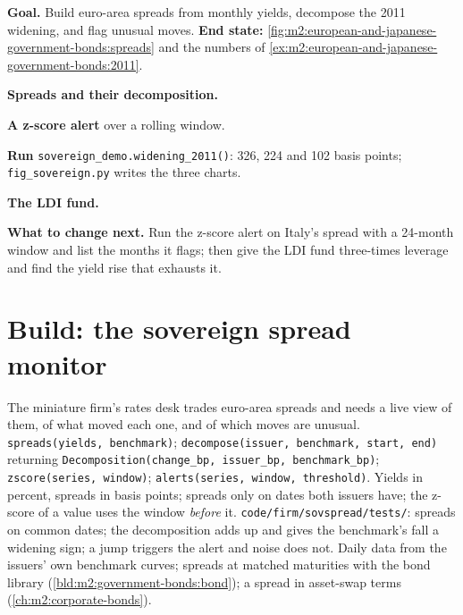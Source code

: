 \begin{tutorial}
\textbf{Goal.} Build euro-area spreads from monthly yields, decompose the 2011
widening, and flag unusual moves. \textbf{End state:}
\cref{fig:m2:european-and-japanese-government-bonds:spreads} and the numbers of
\cref{ex:m2:european-and-japanese-government-bonds:2011}.
\begin{tutsteps}
\item \textbf{Spreads and their decomposition.}
\label{lst:m2:european-and-japanese-government-bonds:spreads}
\item \textbf{A z-score alert} over a rolling window.
\label{lst:m2:european-and-japanese-government-bonds:z}
\item \textbf{Run} \texttt{sovereign\_demo.widening\_2011()}: 326, 224 and 102
basis points; \texttt{fig\_sovereign.py} writes the three charts.
\item \textbf{The LDI fund.}
\label{lst:m2:european-and-japanese-government-bonds:fund}
\end{tutsteps}
\textbf{What to change next.} Run the z-score alert on Italy's spread with a
24-month window and list the months it flags; then give the LDI fund three-times
leverage and find the yield rise that exhausts it.
\end{tutorial}

\section{Build: the sovereign spread monitor}\label{bld:m2:european-and-japanese-government-bonds:monitor}

\begin{build}
 The miniature firm's rates desk trades euro-area spreads and
needs a live view of them, of what moved each one, and of which moves are
unusual.
 \texttt{spreads(yields, benchmark)};
\texttt{decompose(issuer, benchmark, start, end)} returning
\texttt{Decomposition(change\_bp, issuer\_bp, benchmark\_bp)};
\texttt{zscore(series, window)}; \texttt{alerts(series, window, threshold)}.
 Yields in percent, spreads in basis points; spreads only on
dates both issuers have; the z-score of a value uses the window
\emph{before} it.
 \texttt{code/firm/sovspread/tests/}: spreads on
common dates; the decomposition adds up and gives the benchmark's fall a
widening sign; a jump triggers the alert and noise does not.
 Daily data from the issuers' own benchmark curves; spreads
at matched maturities with the bond library
(\cref{bld:m2:government-bonds:bond}); a spread in asset-swap terms
(\cref{ch:m2:corporate-bonds}).
\end{build}

